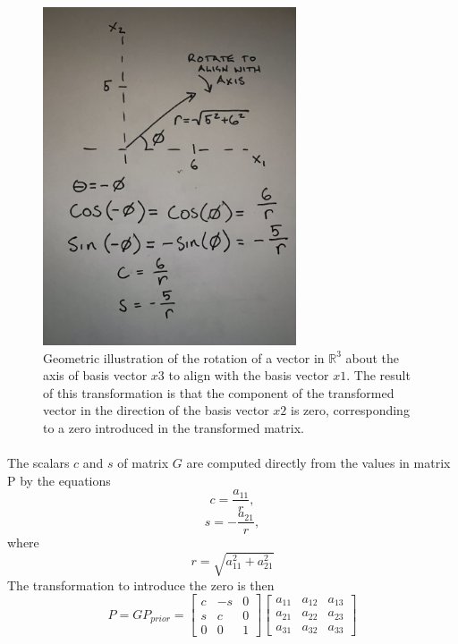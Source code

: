 \documentclass{article}
\begin{document}
\begin{figure}[h]
\centering
\includegraphics[width=75mm, angle=-90]{Givens1}
\caption{Geometric illustration of the rotation of a vector in $\mathbb{R}^3$ about the axis of basis vector ${x3}$ to align with the basis vector ${x1}$. The result of this transformation is that the component of the transformed vector in the direction of the basis vector $x2$ is zero, corresponding to a zero introduced in the transformed matrix.}
\end{figure}

\paragraph{}
The scalars $c$ and $s$ of matrix $G$ are computed directly from the values in matrix P by the equations 
\begin{equation}
c = \frac{a_{11}}{r}, 
\end{equation}
\begin{equation}
s = -\frac{a_{21}}{r}, 
\end{equation}
where
\begin{equation}
 r=\sqrt{a_{11}^2 + a_{21}^2}
\end{equation}
The transformation to introduce the zero is then
\begin{equation}
P = GP_{prior} =
\begin{bmatrix}
c & -s & 0\\
s & c & 0\\
0 & 0 & 1
\end{bmatrix}
\begin{bmatrix}
a_{11} & a_{12} & a_{13}\\
a_{21} & a_{22} & a_{23}\\
a_{31} & a_{32} & a_{33}
\end{bmatrix}
\end{equation}
\end{document}
